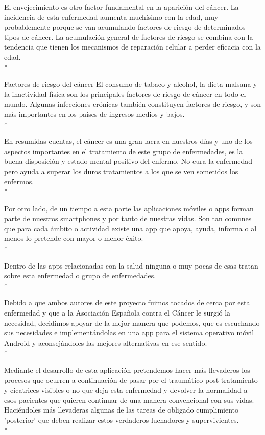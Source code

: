 \documentclass[../pfc.tex]{subfiles}
\begin{document}
El envejecimiento es otro factor fundamental en la aparición del cáncer. La incidencia de esta enfermedad aumenta muchísimo con la edad, muy probablemente porque se van acumulando factores de riesgo de determinados tipos de cáncer. La acumulación general de factores de riesgo se combina con la tendencia que tienen los mecanismos de reparación celular a perder eficacia con la edad.\\*

Factores de riesgo del cáncer
El consumo de tabaco y alcohol, la dieta malsana y la inactividad física son los principales factores de riesgo de cáncer en todo el mundo. Algunas infecciones crónicas también constituyen factores de riesgo, y son más importantes en los países de ingresos medios y bajos.\\*

En resumidas cuentas, el cáncer es una gran lacra en nuestros días \cite{OMS} y uno de los aspectos importantes en el tratamiento de este grupo de enfermedades, es la buena disposición y estado mental positivo del enfermo. No cura la enfermedad pero ayuda a superar los duros tratamientos a los que se ven sometidos los enfermos.\\*

Por otro lado, de un tiempo a esta parte las aplicaciones móviles o apps forman parte de nuestros smartphones y por tanto de nuestras vidas. Son tan comunes que para cada ámbito o actividad existe una app que apoya, ayuda, informa o al menos lo pretende con mayor o menor éxito.\\*

Dentro de las apps relacionadas con la salud ninguna o muy pocas de esas tratan sobre esta enfermedad o grupo de enfermedades.\\*

Debido a que ambos autores de este proyecto fuimos tocados de cerca por esta enfermedad y que a la Asociación Española contra el Cáncer le surgió la necesidad, decidimos apoyar de la mejor manera que podemos, que es escuchando sus necesidades e implementándolas en una app para el sistema operativo móvil Android y aconsejándoles las mejores alternativas en ese sentido. \\*

Mediante el desarrollo de esta aplicación pretendemos hacer más llevaderos los procesos que ocurren a continuación de pasar por el traumático post tratamiento y cicatrices visibles o no que deja esta enfermedad y devolver la normalidad a esos pacientes que quieren continuar de una manera convencional con sus vidas. Haciéndoles más llevaderas algunas de las tareas de obligado cumplimiento 'posterior' que deben realizar estos verdaderos luchadores y supervivientes.\\*
\end{document}
